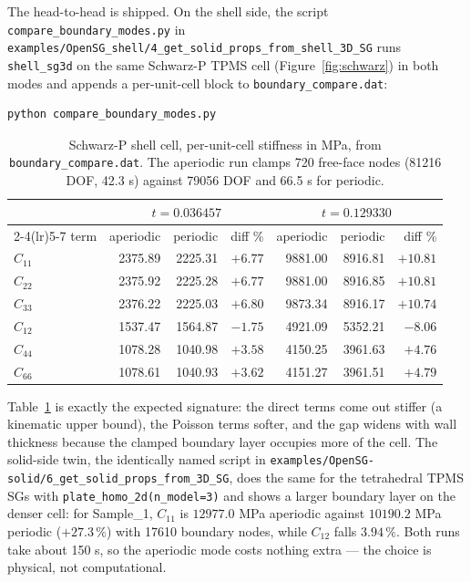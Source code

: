 The head-to-head is shipped. On the shell side, the script
\texttt{compare\_boundary\_modes.py} in
\texttt{examples/OpenSG\_shell/4\_get\_solid\_props\_from\_shell\_3D\_SG}
runs \texttt{shell\_sg3d} on the same Schwarz-P TPMS cell
(Figure~\ref{fig:schwarz}) in both modes and appends a per-unit-cell block to
\texttt{boundary\_compare.dat}:

\begin{lstlisting}[style=shellst]
python compare_boundary_modes.py
\end{lstlisting}

\begin{table}[htbp]
\centering
\caption{Schwarz-P shell cell, per-unit-cell stiffness in MPa, from
\texttt{boundary\_compare.dat}. The aperiodic run clamps 720 free-face nodes
(81216 DOF, 42.3 s) against 79056 DOF and 66.5 s for periodic.}
\label{tab:bcshell}
\small
\begin{tabular}{lrrrrrr}
\toprule
& \multicolumn{3}{c}{$t = 0.036457$} & \multicolumn{3}{c}{$t = 0.129330$} \\
\cmidrule(lr){2-4}\cmidrule(lr){5-7}
term & aperiodic & periodic & diff \% & aperiodic & periodic & diff \% \\
\midrule
$C_{11}$ & 2375.89 & 2225.31 & $+6.77$ & 9881.00 & 8916.81 & $+10.81$ \\
$C_{22}$ & 2375.92 & 2225.28 & $+6.77$ & 9881.00 & 8916.85 & $+10.81$ \\
$C_{33}$ & 2376.22 & 2225.03 & $+6.80$ & 9873.34 & 8916.17 & $+10.74$ \\
$C_{12}$ & 1537.47 & 1564.87 & $-1.75$ & 4921.09 & 5352.21 & $-8.06$ \\
$C_{44}$ & 1078.28 & 1040.98 & $+3.58$ & 4150.25 & 3961.63 & $+4.76$ \\
$C_{66}$ & 1078.61 & 1040.93 & $+3.62$ & 4151.27 & 3961.51 & $+4.79$ \\
\bottomrule
\end{tabular}
\end{table}

Table~\ref{tab:bcshell} is exactly the expected signature: the direct terms come
out stiffer (a kinematic upper bound), the Poisson terms softer, and the gap
widens with wall thickness because the clamped boundary layer occupies more of
the cell. The solid-side twin, the identically named script in
\texttt{examples/OpenSG-solid/6\_get\_solid\_props\_from\_3D\_SG},
does the same for the tetrahedral TPMS SGs with
\texttt{plate\_homo\_2d(n\_model=3)} and shows a larger boundary layer on the
denser cell: for Sample\_1, $C_{11}$ is $12977.0$ MPa aperiodic against
$10190.2$ MPa periodic ($+27.3\,\%$) with 17610 boundary nodes, while
$C_{12}$ falls $3.94\,\%$. Both runs take about 150 s, so the aperiodic mode
costs nothing extra --- the choice is physical, not computational.

